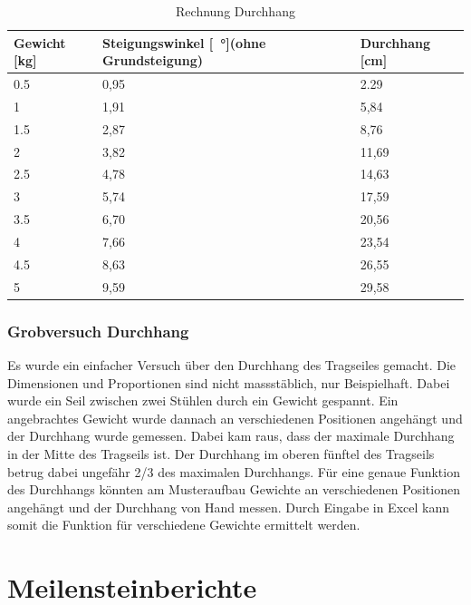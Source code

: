 \documentclass[a4paper]{report}
\begin{document}
\vspace{1em}
\noindent
\begin{table}[h!]
	\begin{tabular}{|p{}|p{}|p{}|}
		\hline
		\textbf{Gewicht [kg]} & \textbf{Steigungswinkel [\SI{}{\degree}](ohne Grundsteigung)} &\textbf{Durchhang [cm]}\\
		\hline
		0.5&0,95&2.29\\
		\hline
		1&1,91&5,84\\
		\hline
		1.5&2,87&8,76\\
		\hline
		2&3,82&11,69\\
		\hline
		2.5&4,78&14,63\\
		\hline
		3&5,74&17,59\\
		\hline
		3.5&6,70&20,56\\
		\hline
		4&7,66&23,54\\
		\hline
		4.5&8,63&26,55\\
		\hline
		5&9,59&29,58\\
		\hline
	\end{tabular}
	\caption{Rechnung Durchhang}
	\label{tbl:DurchhangRechnung}
\end{table}


\subsection{Grobversuch Durchhang}
\label{app:ssec:GrobeversDurch}
Es wurde ein einfacher Versuch über den Durchhang des Tragseiles gemacht. Die Dimensionen und Proportionen sind nicht massstäblich, nur Beispielhaft. Dabei wurde ein Seil zwischen zwei Stühlen durch ein Gewicht gespannt. Ein angebrachtes Gewicht wurde dannach an verschiedenen Positionen angehängt und der Durchhang wurde gemessen. Dabei kam raus, dass der maximale Durchhang in der Mitte des Tragseils ist. Der Durchhang im oberen fünftel des Tragseils betrug dabei ungefähr 2/3 des maximalen Durchhangs.
Für eine genaue Funktion des Durchhangs könnten am Musteraufbau Gewichte an verschiedenen Positionen angehängt und der Durchhang von Hand messen. Durch Eingabe in Excel kann somit die Funktion für verschiedene Gewichte ermittelt werden.

\chapter{Meilensteinberichte}
\label{app:ch:MeilensteinBerichte}
\end{document}
